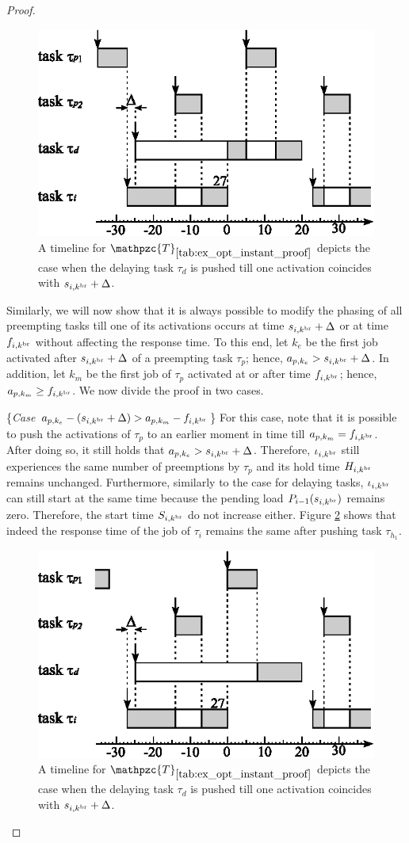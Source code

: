 \begin{proof}
	\begin{figure}[h]
		\centering
		\includegraphics[width=0.45\linewidth]{figures/optimal_instant_proof_2_new} 
		\caption{A timeline for $\mathpzc{T}_{\ref{tab:ex_opt_instant_proof}}$ depicts the case when the delaying task $\tau_d$ is pushed till one activation coincides with $s_{i,k^{\rm{br}}} + \Delta$.}
		\label{fig:optimal_instant_proof_2}
	\end{figure}	
	
	Similarly, we will now show that it is always possible to modify the phasing of all preempting tasks till one of its activations occurs at time $s_{i,k^{\rm{br}}}+\Delta$ or at time $f_{i,k^{\rm{br}}}$ without affecting the response time. To this end, let $k_e$ be the first job activated after $s_{i,k^{\rm{br}}}+\Delta$ of a preempting task $\tau_p$; hence, $a_{p,k_e} > s_{i,k^{\rm{br}}}+\Delta$. In addition, let $k_m$ be the first job of $\tau_p$ activated at or after time $f_{i,k^{\rm{br}}}$; hence, $a_{p,k_m} \geq f_{i,k^{\rm{br}}}$. We now divide the proof in two cases.
	
	\{\textit{Case} $a_{p,k_e}-(s_{i,k^{\rm{br}}} + \Delta) > a_{p,k_m}-f_{i,k^{\rm{br}}}$\} For this case, note that it is possible to push the activations of $\tau_p$ to an earlier moment in time till $a_{p,k_m}=f_{i,k^{\rm{br}}}$. After doing so, it still holds that $a_{p,k_e} > s_{i,k^{\rm{br}}}+\Delta$. Therefore, $\iota_{i,k^{\rm{br}}}$ still experiences the same number of preemptions by $\tau_p$ and its hold time $H_{i,k^{\rm{br}}}$ remains unchanged. Furthermore, similarly to the case for delaying tasks, $\iota_{i,k^{\rm{br}}}$ can still start at the same time because the pending load $P_{i-1}(s_{i,k^{\rm{br}}})$ remains zero. Therefore, the start time $S_{i,k^{\rm{br}}}$ do not increase either. Figure \ref{fig:optimal_instant_proof_3} shows that indeed the response time of the job of $\tau_i$ remains the same after pushing task $\tau_{h_1}$.
	
	\begin{figure}[h]
		\centering
		\includegraphics[width=0.45\linewidth]{figures/optimal_instant_proof_3_new} 
		\caption{A timeline for $\mathpzc{T}_{\ref{tab:ex_opt_instant_proof}}$ depicts the case when the delaying task $\tau_d$ is pushed till one activation coincides with $s_{i,k^{\rm{br}}} + \Delta$.}
		\label{fig:optimal_instant_proof_3}
	\end{figure}
	

\end{proof}
